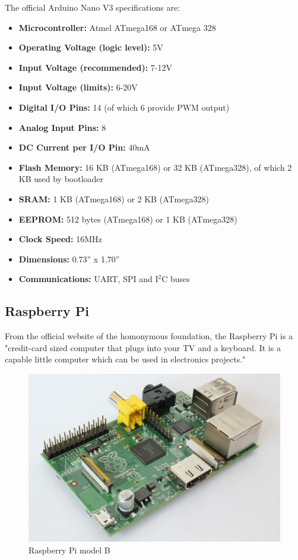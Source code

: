 	The official Arduino Nano V3 specifications are:
		\begin{itemize}
			\item \textbf{Microcontroller:} Atmel ATmega168 or ATmega 328
			\item \textbf{Operating Voltage (logic level):} 5V
			\item \textbf{Input Voltage (recommended):} 7-12V
			\item \textbf{Input Voltage (limits):} 6-20V
			\item \textbf{Digital I/O Pins:} 14 (of which 6 provide PWM output)
			\item \textbf{Analog Input Pins:} 8
			\item \textbf{DC Current per I/O Pin:} 40mA
			\item \textbf{Flash Memory:} 16 KB (ATmega168) or 32 KB (ATmega328), of which 2 KB used by bootloader
			\item \textbf{SRAM:} 1 KB (ATmega168) or 2 KB (ATmega328)
			\item \textbf{EEPROM:} 512 bytes (ATmega168) or 1 KB (ATmega328)
			\item \textbf{Clock Speed:} 16MHz
			\item \textbf{Dimensions:} 0.73'' x 1.70''
			\item \textbf{Communications:} UART, SPI and I$^2$C buses
		\end{itemize}



\newpage
\subsection{Raspberry Pi}

	From the official website of the homonymous foundation, the Raspberry Pi is a "credit-card sized computer that plugs into your TV and a keyboard. It is a capable little computer which can be used in electronics projects."\\

		\begin{figure}[H]
				\centering
				\includegraphics[scale=0.07]{images/ProjectComponents/raspberry.jpg}
				\caption{Raspberry Pi model B}
				\label{}
		\end{figure}
		\bigskip

